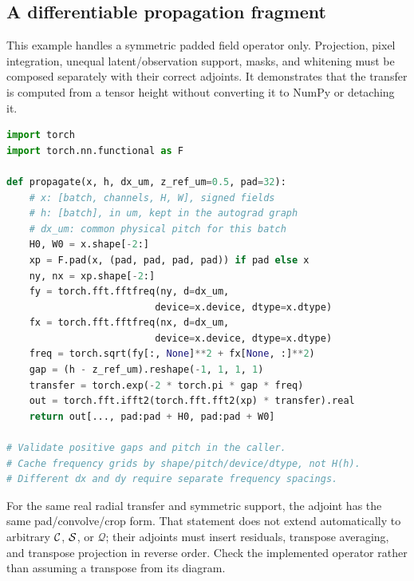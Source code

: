 \subsection{A differentiable propagation fragment}
This example handles a symmetric padded field operator only. Projection, pixel integration, unequal latent/observation support, masks, and whitening must be composed separately with their correct adjoints. It demonstrates that the transfer is computed from a tensor height without converting it to NumPy or detaching it.
\par\noindent\begin{minipage}{\linewidth}
\begin{lstlisting}[language=Python]
import torch
import torch.nn.functional as F

def propagate(x, h, dx_um, z_ref_um=0.5, pad=32):
    # x: [batch, channels, H, W], signed fields
    # h: [batch], in um, kept in the autograd graph
    # dx_um: common physical pitch for this batch
    H0, W0 = x.shape[-2:]
    xp = F.pad(x, (pad, pad, pad, pad)) if pad else x
    ny, nx = xp.shape[-2:]
    fy = torch.fft.fftfreq(ny, d=dx_um,
                          device=x.device, dtype=x.dtype)
    fx = torch.fft.fftfreq(nx, d=dx_um,
                          device=x.device, dtype=x.dtype)
    freq = torch.sqrt(fy[:, None]**2 + fx[None, :]**2)
    gap = (h - z_ref_um).reshape(-1, 1, 1, 1)
    transfer = torch.exp(-2 * torch.pi * gap * freq)
    out = torch.fft.ifft2(torch.fft.fft2(xp) * transfer).real
    return out[..., pad:pad + H0, pad:pad + W0]

# Validate positive gaps and pitch in the caller.
# Cache frequency grids by shape/pitch/device/dtype, not H(h).
# Different dx and dy require separate frequency spacings.
\end{lstlisting}
\end{minipage}\par
For the same real radial transfer and symmetric support, the adjoint has the same pad/convolve/crop form. That statement does not extend automatically to arbitrary $\mathcal C$, $\mathcal S$, or $\mathcal Q$; their adjoints must insert residuals, transpose averaging, and transpose projection in reverse order. Check the implemented operator rather than assuming a transpose from its diagram.

